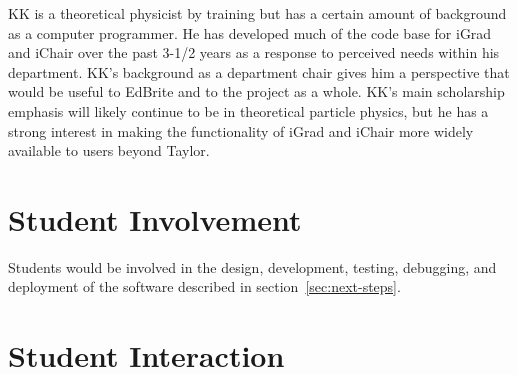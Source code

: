 \documentclass{article}
\begin{document}
KK is a theoretical physicist by training but has a certain amount
of background as a computer programmer.  He has developed much of
the code base for iGrad and iChair over the past 3-1/2 years
as a response to perceived needs within his department.  KK's
background as a department chair gives him a perspective that would
be useful to EdBrite and to the project as a whole.  KK's main
scholarship emphasis will likely continue to be in theoretical
particle physics, but he has a strong interest in making the
functionality of iGrad and iChair more widely available to
users beyond Taylor.

\section{Student Involvement}
\label{sec:student-involvement}



Students would be involved in the design, development, testing, debugging, and deployment
of the software described in section~\ref{sec:next-steps}.

\section{Student Interaction}
\label{sec:student-interaction}



\end{document}
